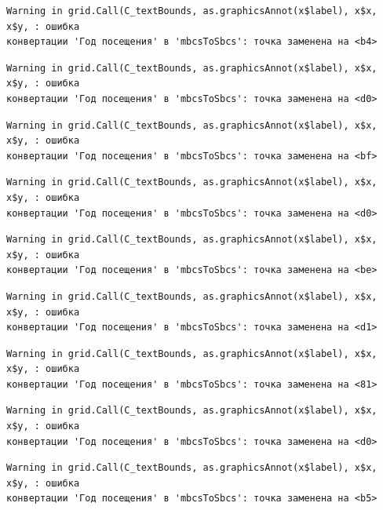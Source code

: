\documentclass[
  letterpaper,
  DIV=11,
  numbers=noendperiod]{scrreprt}
\begin{document}
\begin{verbatim}
Warning in grid.Call(C_textBounds, as.graphicsAnnot(x$label), x$x, x$y, : ошибка
конвертации 'Год посещения' в 'mbcsToSbcs': точка заменена на <b4>
\end{verbatim}

\begin{verbatim}
Warning in grid.Call(C_textBounds, as.graphicsAnnot(x$label), x$x, x$y, : ошибка
конвертации 'Год посещения' в 'mbcsToSbcs': точка заменена на <d0>
\end{verbatim}

\begin{verbatim}
Warning in grid.Call(C_textBounds, as.graphicsAnnot(x$label), x$x, x$y, : ошибка
конвертации 'Год посещения' в 'mbcsToSbcs': точка заменена на <bf>
\end{verbatim}

\begin{verbatim}
Warning in grid.Call(C_textBounds, as.graphicsAnnot(x$label), x$x, x$y, : ошибка
конвертации 'Год посещения' в 'mbcsToSbcs': точка заменена на <d0>
\end{verbatim}

\begin{verbatim}
Warning in grid.Call(C_textBounds, as.graphicsAnnot(x$label), x$x, x$y, : ошибка
конвертации 'Год посещения' в 'mbcsToSbcs': точка заменена на <be>
\end{verbatim}

\begin{verbatim}
Warning in grid.Call(C_textBounds, as.graphicsAnnot(x$label), x$x, x$y, : ошибка
конвертации 'Год посещения' в 'mbcsToSbcs': точка заменена на <d1>
\end{verbatim}

\begin{verbatim}
Warning in grid.Call(C_textBounds, as.graphicsAnnot(x$label), x$x, x$y, : ошибка
конвертации 'Год посещения' в 'mbcsToSbcs': точка заменена на <81>
\end{verbatim}

\begin{verbatim}
Warning in grid.Call(C_textBounds, as.graphicsAnnot(x$label), x$x, x$y, : ошибка
конвертации 'Год посещения' в 'mbcsToSbcs': точка заменена на <d0>
\end{verbatim}

\begin{verbatim}
Warning in grid.Call(C_textBounds, as.graphicsAnnot(x$label), x$x, x$y, : ошибка
конвертации 'Год посещения' в 'mbcsToSbcs': точка заменена на <b5>
\end{verbatim}
\end{document}
